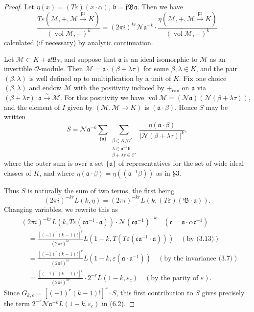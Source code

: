 \documentclass[12pt,a4paper]{article}
\theoremstyle{plain}
\theoremstyle{definition}
\theoremstyle{remark}
\DeclareMathOperator{\vol}{vol}
\DeclareMathOperator{\pr}{pr}
\begin{document}
\begin{proof}
Let $\eta(x) = (T\varepsilon)(x \cdot \alpha)$, $\mathfrak{b} = \mathfrak{f}\mathfrak{B}\mathfrak{a}$. Then we have
\[
\frac{T\varepsilon(\mathscr{M}, +, \mathscr{M} \xrightarrow{\pr} K)}{(\vol \mathscr{M}, +)^k} = (2\pi i)^{kr} \mathcal{N}\mathfrak{a}^{-k} \cdot \frac{\eta(\mathscr{M}, +, \mathscr{M} \xrightarrow{\pr} K)}{(\vol \mathscr{M}, +)^k}
\]
calculated (if necessary) by analytic continuation.

Let $\mathscr{M} \subset K + \mathfrak{a}\mathfrak{B}\tau$, and suppose that $\mathfrak{a}$ is an ideal isomorphic to $\mathscr{M}$ as an invertible $\mathcal{O}$-module. Then $\mathscr{M} = \mathfrak{a} \cdot (\beta + \lambda\tau)$ for some $\beta, \lambda \in K$, and the pair $(\beta, \lambda)$ is well defined up to multiplication by a unit of $K$. Fix one choice $(\beta, \lambda)$ and endow $\mathscr{M}$ with the positivity induced by $+_{\mathrm{can}}$ on $\mathfrak{a}$ via $(\beta + \lambda\tau): \mathfrak{a} \xrightarrow{\sim} \mathscr{M}$. For this positivity we have $\vol \mathscr{M} = (\mathcal{N}\mathfrak{a})(\mathcal{N}(\beta + \lambda\tau))$, and the element of $I$ given by $(\mathscr{M}, \mathscr{M} \to K)$ is $(\mathfrak{a} \cdot \beta)$. Hence $S$ may be written
\[
S = \mathcal{N}\mathfrak{a}^{-k} \sum_{\{\mathfrak{a}\}} \sum_{\substack{\beta \in K/\mathcal{O}^* \\ \lambda \in \mathfrak{a}^{-1}\mathfrak{b} \\ \beta + \lambda\tau \in \mathcal{E}'}} \frac{\eta(\mathfrak{a} \cdot \beta)}{|\mathcal{N}(\beta + \lambda\tau)|^k},
\]
where the outer sum is over a set $\{\mathfrak{a}\}$ of representatives for the set of wide ideal classes of $K$, and where $\eta(\mathfrak{a} \cdot \beta) = \eta((\mathfrak{a}^{-1}\beta))$ as in \S3.

Thus $S$ is naturally the sum of two terms, the first being
\[
(2\pi i)^{-kr} L(k, \eta) = (2\pi i)^{-kr} L(k, (T\varepsilon)(\mathfrak{B} \cdot \mathfrak{a})).
\]
Changing variables, we rewrite this as
\begin{align*}
&(2\pi i)^{-kr} L(k, T\varepsilon(\mathfrak{c}\mathfrak{a}^{-1} \cdot \mathfrak{a})) \cdot \mathcal{N}(\mathfrak{c}\mathfrak{a}^{-1})^{-k} \quad (\mathfrak{c} = \mathfrak{a} \cdot \alpha\mathfrak{c}^{-1}) \\
&\quad = \frac{[(-1)^r(k-1)!]^r}{(2\pi i)^{kr}} L(1-k, T(T\varepsilon(\mathfrak{c}\mathfrak{a}^{-1} \cdot \mathfrak{a}))) \quad (\text{by (3.13)}) \\
&\quad = \frac{[(-1)^r(k-1)!]^r}{(2\pi i)^{kr}} L(1-k, \varepsilon(\mathfrak{a} \cdot \mathfrak{a}^{-1})) \quad (\text{by the invariance (3.7)}) \\
&\quad = \frac{[(-1)^r(k-1)!]^r}{(2\pi i)^{kr}} \cdot 2^{-r} L(1-k, \varepsilon_c) \quad (\text{by the parity of } \varepsilon).
\end{align*}
Since $G_{k,\varepsilon} = [(-1)^r(k-1)!]^r \cdot S$, this first contribution to $S$ gives precisely the term $2^{-r}\mathcal{N}\mathfrak{a}^{-k} L(1-k, \varepsilon_c)$ in (6.2).


\end{proof}
\end{document}
